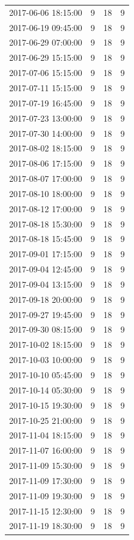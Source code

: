 \begin{tabular}{lrrr}
2017-06-06 18:15:00 & 9 & 18 & 9 \\
2017-06-19 09:45:00 & 9 & 18 & 9 \\
2017-06-29 07:00:00 & 9 & 18 & 9 \\
2017-06-29 15:15:00 & 9 & 18 & 9 \\
2017-07-06 15:15:00 & 9 & 18 & 9 \\
2017-07-11 15:15:00 & 9 & 18 & 9 \\
2017-07-19 16:45:00 & 9 & 18 & 9 \\
2017-07-23 13:00:00 & 9 & 18 & 9 \\
2017-07-30 14:00:00 & 9 & 18 & 9 \\
2017-08-02 18:15:00 & 9 & 18 & 9 \\
2017-08-06 17:15:00 & 9 & 18 & 9 \\
2017-08-07 17:00:00 & 9 & 18 & 9 \\
2017-08-10 18:00:00 & 9 & 18 & 9 \\
2017-08-12 17:00:00 & 9 & 18 & 9 \\
2017-08-18 15:30:00 & 9 & 18 & 9 \\
2017-08-18 15:45:00 & 9 & 18 & 9 \\
2017-09-01 17:15:00 & 9 & 18 & 9 \\
2017-09-04 12:45:00 & 9 & 18 & 9 \\
2017-09-04 13:15:00 & 9 & 18 & 9 \\
2017-09-18 20:00:00 & 9 & 18 & 9 \\
2017-09-27 19:45:00 & 9 & 18 & 9 \\
2017-09-30 08:15:00 & 9 & 18 & 9 \\
2017-10-02 18:15:00 & 9 & 18 & 9 \\
2017-10-03 10:00:00 & 9 & 18 & 9 \\
2017-10-10 05:45:00 & 9 & 18 & 9 \\
2017-10-14 05:30:00 & 9 & 18 & 9 \\
2017-10-15 19:30:00 & 9 & 18 & 9 \\
2017-10-25 21:00:00 & 9 & 18 & 9 \\
2017-11-04 18:15:00 & 9 & 18 & 9 \\
2017-11-07 16:00:00 & 9 & 18 & 9 \\
2017-11-09 15:30:00 & 9 & 18 & 9 \\
2017-11-09 17:30:00 & 9 & 18 & 9 \\
2017-11-09 19:30:00 & 9 & 18 & 9 \\
2017-11-15 12:30:00 & 9 & 18 & 9 \\
2017-11-19 18:30:00 & 9 & 18 & 9 \\

\end{tabular}
